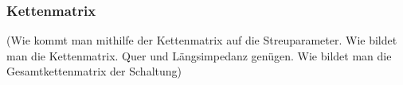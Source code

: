 \subsubsection{Kettenmatrix}\label{subsec:kettenmatrix}
(Wie kommt man mithilfe der Kettenmatrix auf die Streuparameter. Wie bildet man die Kettenmatrix. Quer und Längsimpedanz genügen. Wie bildet man die Gesamtkettenmatrix der Schaltung)